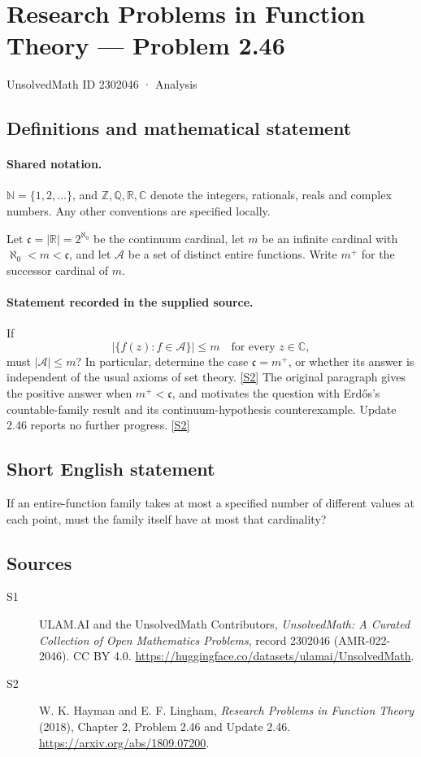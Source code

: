 \documentclass[11pt]{article}
\newcommand{\sref}[2]{\hyperlink{source:#1:#2}{[S#2]}}
\begin{document}
\setcounter{section}{2302045}
\section{Research Problems in Function Theory — Problem 2.46}\label{2302046}
{\small\sffamily UnsolvedMath ID 2302046 · Analysis}
\subsection{Definitions and mathematical statement}

\paragraph{Shared notation.}$\mathbb N=\{1,2,\ldots\}$, and $\mathbb Z,\mathbb Q,\mathbb R,\mathbb C$ denote the integers, rationals, reals and complex numbers. Any other conventions are specified locally.


Let $\mathfrak c=|\mathbb R|=2^{\aleph_0}$ be the continuum cardinal, let $m$ be an infinite cardinal with $\aleph_0<m<\mathfrak c$, and let $\mathcal A$ be a set of distinct entire functions. Write $m^+$ for the successor cardinal of $m$.

\paragraph{Statement recorded in the supplied source.}
If
\[\bigl|\{f(z):f\in\mathcal A\}\bigr|\le m\quad\text{for every }z\in\mathbb C,\]
must $|\mathcal A|\le m$? In particular, determine the case $\mathfrak c=m^+$, or whether its answer is independent of the usual axioms of set theory. \sref{2302046}{2}
The original paragraph gives the positive answer when $m^+<\mathfrak c$, and motivates the question with Erdős's countable-family result and its continuum-hypothesis counterexample. Update 2.46 reports no further progress. \sref{2302046}{2}
\subsection{Short English statement}
If an entire-function family takes at most a specified number of different values at each point, must the family itself have at most that cardinality?
\subsection{Sources}
\begin{description}
\item[\hypertarget{source:2302046:1}{S1}] ULAM.AI and the UnsolvedMath Contributors, \emph{UnsolvedMath: A Curated Collection of Open Mathematics Problems}, record 2302046 (AMR-022-2046). CC BY 4.0. \url{https://huggingface.co/datasets/ulamai/UnsolvedMath}.
\item[\hypertarget{source:2302046:2}{S2}] W. K. Hayman and E. F. Lingham, \emph{Research Problems in Function Theory} (2018), Chapter 2, Problem 2.46 and Update 2.46. \url{https://arxiv.org/abs/1809.07200}.
\end{description}
\label{end:2302046}
\end{document}
